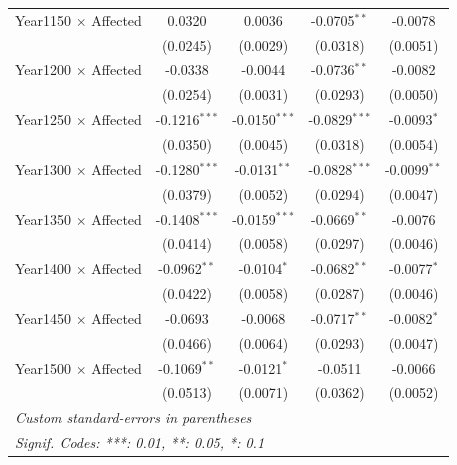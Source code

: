 \begin{table}
\begin{tabular}{lcccc}
   Year1150 $\times$ Affected  & 0.0320          & 0.0036          & -0.0705$^{**}$  & -0.0078\\   
                               & (0.0245)        & (0.0029)        & (0.0318)        & (0.0051)\\   
   Year1200 $\times$ Affected  & -0.0338         & -0.0044         & -0.0736$^{**}$  & -0.0082\\   
                               & (0.0254)        & (0.0031)        & (0.0293)        & (0.0050)\\   
   Year1250 $\times$ Affected  & -0.1216$^{***}$ & -0.0150$^{***}$ & -0.0829$^{***}$ & -0.0093$^{*}$\\   
                               & (0.0350)        & (0.0045)        & (0.0318)        & (0.0054)\\   
   Year1300 $\times$ Affected  & -0.1280$^{***}$ & -0.0131$^{**}$  & -0.0828$^{***}$ & -0.0099$^{**}$\\   
                               & (0.0379)        & (0.0052)        & (0.0294)        & (0.0047)\\   
   Year1350 $\times$ Affected  & -0.1408$^{***}$ & -0.0159$^{***}$ & -0.0669$^{**}$  & -0.0076\\   
                               & (0.0414)        & (0.0058)        & (0.0297)        & (0.0046)\\   
   Year1400 $\times$ Affected  & -0.0962$^{**}$  & -0.0104$^{*}$   & -0.0682$^{**}$  & -0.0077$^{*}$\\   
                               & (0.0422)        & (0.0058)        & (0.0287)        & (0.0046)\\   
   Year1450 $\times$ Affected  & -0.0693         & -0.0068         & -0.0717$^{**}$  & -0.0082$^{*}$\\   
                               & (0.0466)        & (0.0064)        & (0.0293)        & (0.0047)\\   
   Year1500 $\times$ Affected  & -0.1069$^{**}$  & -0.0121$^{*}$   & -0.0511         & -0.0066\\   
                               & (0.0513)        & (0.0071)        & (0.0362)        & (0.0052)\\   
   \midrule \midrule
   \multicolumn{5}{l}{\emph{Custom standard-errors in parentheses}}\\
   \multicolumn{5}{l}{\emph{Signif. Codes: ***: 0.01, **: 0.05, *: 0.1}}\\
\end{tabular}
\end{table}

